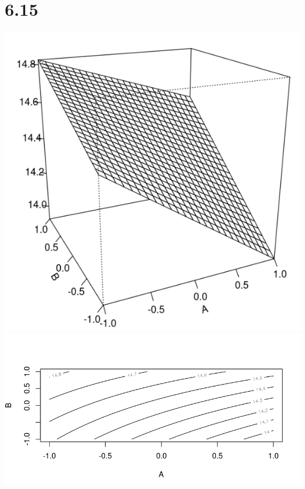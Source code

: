 \documentclass{article}
\begin{document}
\section*{6.15}
\includegraphics{6.15persp.PNG}
\\\includegraphics{6.15cont.PNG}
\newpage
\end{document}

